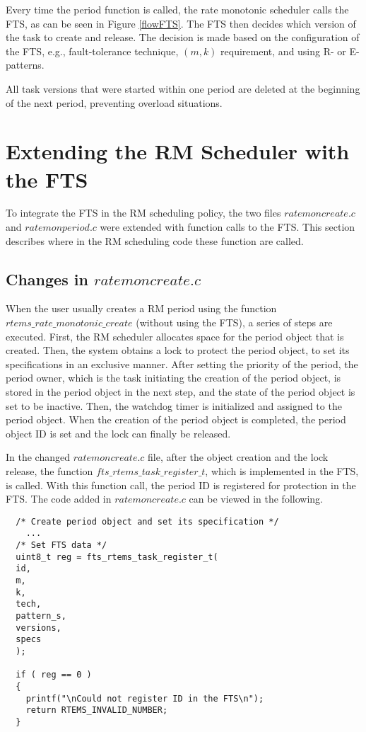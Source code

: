 Every time the period function is called, the rate monotonic scheduler calls the FTS, as can be seen in Figure \ref{flowFTS}. The FTS then decides which version of the task to create and release. The decision is made based on the configuration of the FTS, e.g., fault-tolerance technique, $(m,k)$ requirement, and using R- or E-patterns. 

All task versions that were started within one period are deleted at the beginning of the next period, preventing overload situations.

\section{Extending the RM Scheduler with the FTS}
To integrate the FTS in the RM scheduling policy, the two files $ratemoncreate.c$ and $ratemonperiod.c$ were extended with function calls to the FTS. This section describes where in the RM scheduling code these function are called.

\subsection{Changes in $ratemoncreate.c$}
When the user usually creates a RM period using the function $rtems\_rate\_monotonic\_create$ (without using the FTS), a series of steps are executed. First, the RM scheduler allocates space for the period object that is created. Then, the system obtains a lock to protect the period object, to set its specifications in an exclusive manner. After setting the priority of the period, the period owner, which is the task initiating the creation of the period object, is stored in the period object in the next step, and the state of the period object is set to be inactive. Then, the watchdog timer is initialized and assigned to the period object. When the creation of the period object is completed, the period object ID is set and the lock can finally be released. 

In the changed $ratemoncreate.c$ file, after the object creation and the lock release, the function $fts\_rtems\_task\_register\_t$, which is implemented in the FTS, is called. With this function call, the period ID is registered for protection in the FTS. The code added in $ratemoncreate.c$ can be viewed in the following.
\begin{lstlisting}
  /* Create period object and set its specification */	
    ...
  /* Set FTS data */
  uint8_t reg = fts_rtems_task_register_t(
  id,
  m,
  k,
  tech,
  pattern_s,
  versions,
  specs
  );

  if ( reg == 0 ) 
  {
    printf("\nCould not register ID in the FTS\n");
    return RTEMS_INVALID_NUMBER;
  }
\end{lstlisting}

